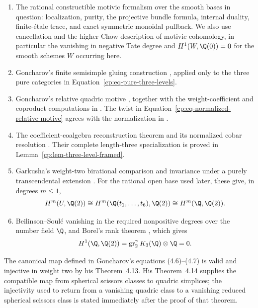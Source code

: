 \begin{enumerate}[label=(\arabic*)]
\item The rational constructible motivic formalism over the smooth bases in
      question: localization, purity, the projective bundle formula,
      internal duality, finite-\'etale trace, and exact symmetric monoidal
      pullback.  We also use cancellation and the higher-Chow description
      of motivic cohomology, in particular the vanishing in negative Tate
      degree and \(H^1(W,\Q(0))=0\) for the smooth schemes \(W\) occurring
      here.

\item Goncharov's finite semisimple gluing construction
      \cite[Chapter~5, Section~1]{Goncharov1999}, applied only to the three
      pure categories in Equation~\eqref{cp:eq-pure-three-levels}.

\item Goncharov's relative quadric motive
      \cite[Chapter~5, Section~2]{Goncharov1999}, together with the
      weight-coefficient and coproduct computations in
      \cite[Theorem~4.8 and Proposition~4.9]{Goncharov1999}.  The twist in
      Equation~\eqref{cp:eq-normalized-relative-motive} agrees with the
      normalization in \cite[Definition~5.8]{Brown2013}.

\item The coefficient-coalgebra reconstruction theorem and its normalized
      cobar resolution \cite{BGSV1990,Goncharov1999}.  Their complete
      length-three specialization is proved in
      Lemma~\ref{cp:lem-three-level-framed}.

\item Garkusha's weight-two birational comparison and invariance under a
      purely transcendental extension
      \cite[Corollaries~3.10, 3.11, 3.13 and Theorem~3.14]{Garkusha2023}.
      For the rational open base used later, these give, in degrees
      \(m\leq1\),
      \[
       H^m(U,\Q(2))\cong H^m(\Q(t_1,\ldots,t_6),\Q(2))
       \cong H^m(\Q,\Q(2)).
      \]

\item Beilinson--Soul\'e vanishing in the required nonpositive degrees over
      the number field \(\Q\), and Borel's rank theorem
      \cite{Borel1977}, which gives
      \[
       H^1(\Q,\Q(2))
       =\operatorname{gr}^{\gamma}_2K_3(\Q)\otimes\Q=0.
      \]
\end{enumerate}

\begin{theorem}
\label{cp:thm-goncharov-inputs}
The canonical map defined in Goncharov's equations \textup{(4.6)--(4.7)}
\cite{Goncharov1999} is valid and injective in weight two by his
Theorem~4.13.  His Theorem~4.14 supplies the compatible map from spherical
scissors classes to quadric simplices; the injectivity used to return from a
vanishing quadric class to a vanishing reduced spherical scissors class is
stated immediately after the proof of that theorem.
\end{theorem}

